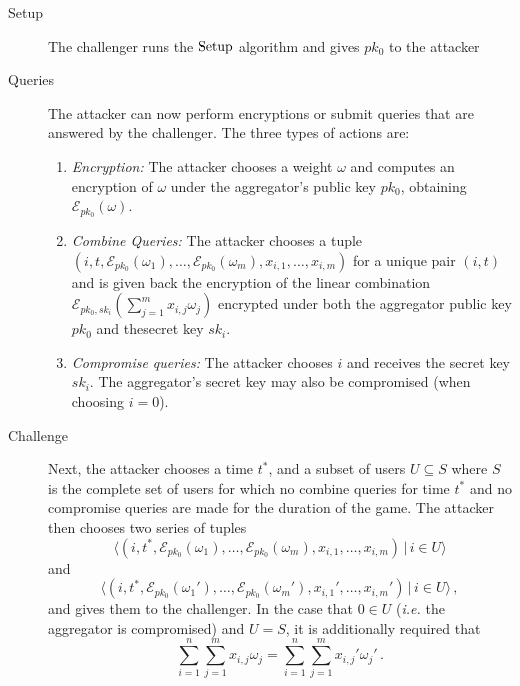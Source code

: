 \documentclass[twocolumn]{autart}
\theoremstyle{definition}
\begin{document}
\begin{description}
    \item[Setup] The challenger runs the $\operatorfont{Setup}$ algorithm and gives $pk_0$ to the attacker
    \item[Queries] The attacker can now perform encryptions or submit queries that are answered by the challenger. The three types of actions are:
    \begin{enumerate}
        \item \textit{Encryption:} The attacker chooses a weight $\omega$ and computes an encryption of $\omega$ under the aggregator's public key $pk_0$, obtaining $\mathcal{E}_{pk_0}(\omega)$.
        \item \textit{Combine Queries:} The attacker chooses a tuple $(i,t,\mathcal{E}_{pk_0}(\omega_1),\dots,\mathcal{E}_{pk_0}(\omega_m),x_{i,1},\dots,x_{i,m})$ for a unique pair $(i,t)$ and is given back the encryption of the linear combination $\mathcal{E}_{pk_0,sk_i}(\sum^m_{j=1}x_{i,j}\omega_j)$ encrypted under both the aggregator public key $pk_0$ and thesecret key $sk_i$.
        \item \textit{Compromise queries:} The attacker chooses $i$ and receives the secret key $sk_i$. The aggregator's secret key may also be compromised (when choosing $i=0$).
    \end{enumerate} 
    \item[Challenge] Next, the attacker chooses a time $t^*$, and a subset of users $U \subseteq S$ where $S$ is the complete set of users for which no combine queries for time $t^*$ and no compromise queries are made for the duration of the game. The attacker then chooses two series of tuples
    \begin{equation*}
        \langle(i,t^*,\mathcal{E}_{pk_0}(\omega_1),\dots,\mathcal{E}_{pk_0}(\omega_m),x_{i,1},\dots,x_{i,m})\,|\,i \in U\rangle
    \end{equation*}
    and
    \begin{equation*}
        \langle(i,t^*,\mathcal{E}_{pk_0}(\omega_1'),\dots,\mathcal{E}_{pk_0}(\omega_m'),x_{i,1}',\dots,x_{i,m}')\,|\, i \in U\rangle\,,
    \end{equation*}
    and gives them to the challenger. In the case that $0 \in U$ (\textit{i.e.} the aggregator is compromised) and $U = S$, it is additionally required that
    \begin{equation*}
        \sum^{n}_{i=1}\sum^{m}_{j=1} x_{i,j}\omega_j = \sum^{n}_{i=1}\sum^{m}_{j=1} x_{i,j}'\omega_j'\,.
    \end{equation*}

\end{description}
\end{document}
